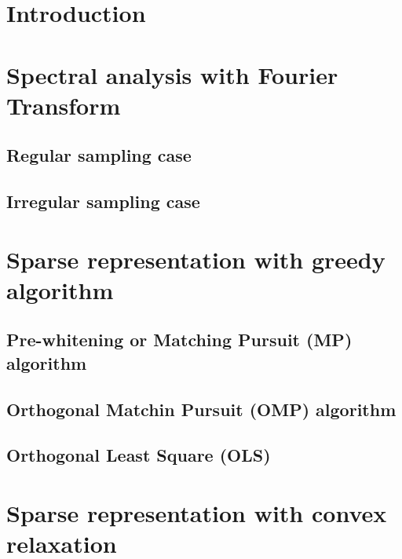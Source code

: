 
\section{Introduction}



\section{Spectral analysis with Fourier Transform}

\subsection{Regular sampling case}

\subsection{Irregular sampling case}



\section{Sparse representation with greedy algorithm}

\subsection{Pre-whitening or Matching Pursuit (MP) algorithm}

\subsection{Orthogonal Matchin Pursuit (OMP) algorithm}

\subsection{Orthogonal Least Square (OLS)}



\section{Sparse representation with convex relaxation}
